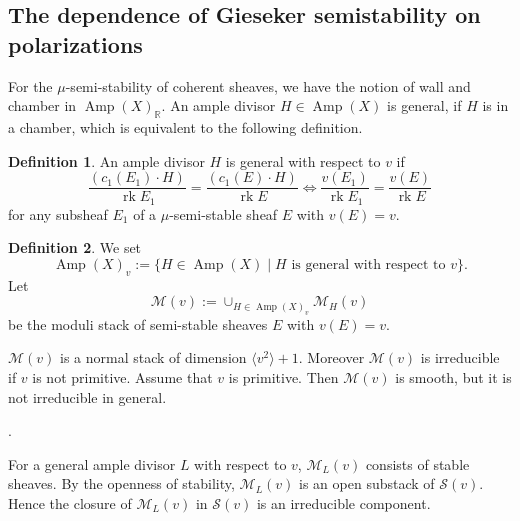 \documentclass[10pt]{amsart}
\def\cal{\mathcal}
\def\Bbb{\mathbb}
\newenvironment{NB}{
\color{red}{\bf NB}. \footnotesize 
}{}
\newcommand{\Coh}{\operatorname{Coh}}
\newcommand{\rk}{\operatorname{rk}}
\newcommand{\Amp}{\operatorname{Amp}}
\numberwithin{equation}{section}
\theoremstyle{plain}
\newtheorem{thm}{Theorem}[section]
\theoremstyle{definition}
\newtheorem{defn}[thm]{Definition}
\theoremstyle{remark}
\begin{document}


\subsection{The dependence of Gieseker semistability on polarizations}\label{subsect:chamber}

For the $\mu$-semi-stability of coherent sheaves, we have the notion of
wall and chamber in $\Amp(X)_{\Bbb R}$.
An ample divisor $H \in \Amp(X)$ is general, if $H$ is in a chamber, which is equivalent to the following
definition. 

\begin{defn}
An ample divisor $H$ is general with respect to $v$
if 
$$
\frac{(c_1(E_1) \cdot H)}{\rk E_1}=\frac{(c_1(E) \cdot H)}{\rk E}
\iff \frac{v(E_1)}{\rk E_1}=\frac{v(E)}{\rk E}
$$ 
for any subsheaf $E_1$ of a $\mu$-semi-stable sheaf $E$ with $v(E)=v$.
\end{defn}


\begin{defn}\label{defn:stable}
We set 
$$
\Amp(X)_v:=\{ H \in \Amp(X) \mid \text{$H$ is general with respect to $v$} \}.
$$
Let
$$
{\cal M}(v):=\cup_{H \in \Amp(X)_v } {\cal M}_H(v)
$$
be the moduli stack of semi-stable sheaves $E$ with $v(E)=v$.
\end{defn}
${\cal M}(v)$ is a normal stack of dimension $\langle v^2 \rangle+1$.
Moreover ${\cal M}(v)$ is irreducible if $v$ is not primitive.
Assume that $v$ is primitive.
Then ${\cal M}(v)$ is smooth, but it is not irreducible in general.

\begin{NB}
For a general ample divisor $L$ with respect to $v$,
${\cal M}_L(v)$ consists of stable sheaves.
By the openness of stability, ${\cal M}_L(v)$ is an open substack of ${\cal S}(v)$.
Hence the closure of 
${\cal M}_L(v)$ in ${\cal S}(v)$ is an irreducible component. 
\end{NB}
\end{document}
